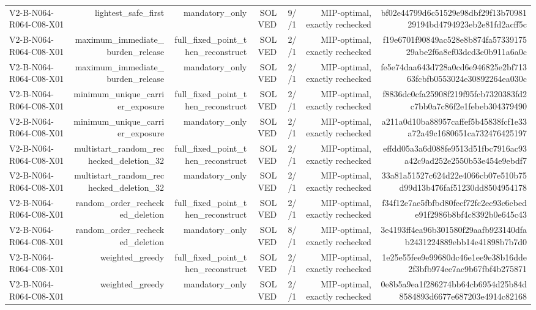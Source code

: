 {\begin{longtable}{lrrrrrr}
V2-B-N064-R064-C08-X01 & lightest\_safe\_first & mandatory\_only & SOLVED & 9//1 & MIP-optimal, exactly rechecked & bf02e44799d6c51529e98dbf29f13b7098129194bd4794923eb2e81fd2acff5c \\
V2-B-N064-R064-C08-X01 & maximum\_immediate\_burden\_release & full\_fixed\_point\_then\_reconstruct & SOLVED & 2//1 & MIP-optimal, exactly rechecked & f19e6701f90849ac528e8b874fa5733917529abe2f6a8ef03dcd3e0b911a6a0c \\
V2-B-N064-R064-C08-X01 & maximum\_immediate\_burden\_release & mandatory\_only & SOLVED & 2//1 & MIP-optimal, exactly rechecked & fe5e74daa643d728a0cd6e946825e2bf71363fcbfb0553024e30892264ea030c \\
V2-B-N064-R064-C08-X01 & minimum\_unique\_carrier\_exposure & full\_fixed\_point\_then\_reconstruct & SOLVED & 2//1 & MIP-optimal, exactly rechecked & f8836dc0cfa25908f219f95fcb7320383fd2c7bb0a7c86f2e1febeb304379490 \\
V2-B-N064-R064-C08-X01 & minimum\_unique\_carrier\_exposure & mandatory\_only & SOLVED & 2//1 & MIP-optimal, exactly rechecked & a211a0d10ba88957caffef5b45838fcf1e33a72a49c1680651ca732476425197 \\
V2-B-N064-R064-C08-X01 & multistart\_random\_rechecked\_deletion\_32 & full\_fixed\_point\_then\_reconstruct & SOLVED & 2//1 & MIP-optimal, exactly rechecked & effdd05a3a6d088fe9513d51fbc7916ac93a42c9ad252e2550b53e454e9ebdf7 \\
V2-B-N064-R064-C08-X01 & multistart\_random\_rechecked\_deletion\_32 & mandatory\_only & SOLVED & 2//1 & MIP-optimal, exactly rechecked & 33a81a51527c624d22e4066cb07e510b75d99d13b476faf51230dd8504954178 \\
V2-B-N064-R064-C08-X01 & random\_order\_rechecked\_deletion & full\_fixed\_point\_then\_reconstruct & SOLVED & 2//1 & MIP-optimal, exactly rechecked & f34f12e7ae5fbfbd80fecf72fc2ec93c6cbede91f2986b8bf4c8392b0e645c43 \\
V2-B-N064-R064-C08-X01 & random\_order\_rechecked\_deletion & mandatory\_only & SOLVED & 8//1 & MIP-optimal, exactly rechecked & 3e4193ff4ea96b301580f29aafb923140dfab2431224889ebb14e41898b7b7d0 \\
V2-B-N064-R064-C08-X01 & weighted\_greedy & full\_fixed\_point\_then\_reconstruct & SOLVED & 2//1 & MIP-optimal, exactly rechecked & 1e25e55fee9e99680dc46e1ee9e38b16dde2f3bfb974ee7ac9b67fbf4b275871 \\
V2-B-N064-R064-C08-X01 & weighted\_greedy & mandatory\_only & SOLVED & 2//1 & MIP-optimal, exactly rechecked & 0e8b5a9ea1f286274bb64cb6954d25b84d8584893d6677e687203e4914c82168 \\

\end{longtable}}
